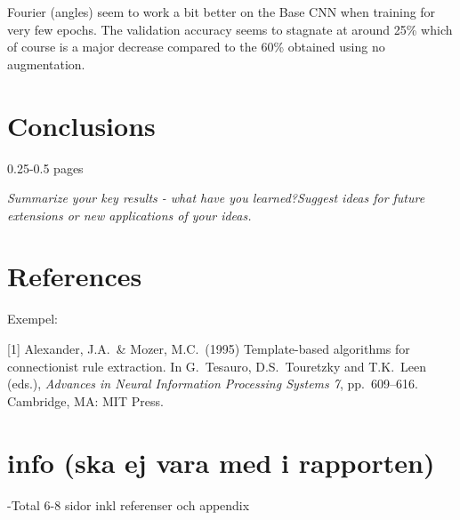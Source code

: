 \documentclass{article}
\begin{document}
Fourier (angles) seem to work a bit better on the Base CNN when training for very few epochs. The validation accuracy seems to stagnate at around 25\% which of course is a major decrease compared to the 60\% obtained using no augmentation.



\section{Conclusions}

0.25-0.5 pages

\textit{Summarize your key results - what have you learned?Suggest ideas for future extensions or new applications of your ideas.}

\section*{References}

Exempel:
\medskip

\small

[1] Alexander, J.A.\ \& Mozer, M.C.\ (1995) Template-based algorithms for
connectionist rule extraction. In G.\ Tesauro, D.S.\ Touretzky and T.K.\ Leen
(eds.), {\it Advances in Neural Information Processing Systems 7},
pp.\ 609--616. Cambridge, MA: MIT Press.

\section{info (ska ej vara med i rapporten)}

-Total 6-8 sidor inkl referenser och appendix
\end{document}
